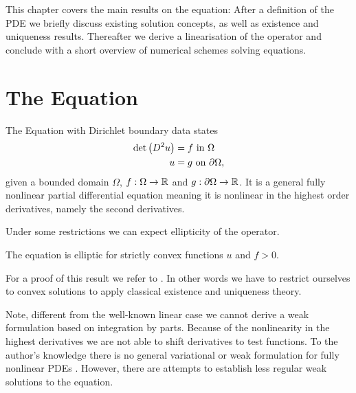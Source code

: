 This chapter covers the main results on the \MA equation: After a definition of the PDE we briefly discuss existing solution concepts, as well as existence and uniqueness results. Thereafter we derive a linearisation of the \MA operator and conclude with a short overview of numerical schemes solving \MA equations. 


\section{The \MA Equation}

The \MA Equation with Dirichlet boundary data states
\begin{align}
	 \det{\left(D^2 u\right)} &= f \textnormal{ in } \Omega \label{eq: MA eq}\\
	 u & = g \textnormal{ on } \partial \Omega, \label{eq: MA equation dirilecht}
\end{align}
given a bounded domain $\Omega$, $f:\Omega \rightarrow \mathbb{R}$ and $g:\partial \Omega \rightarrow \mathbb{R}$.
It is a general fully nonlinear partial differential equation meaning it is nonlinear in the highest order derivatives, namely the second derivatives.

Under some restrictions we can expect ellipticity of the \MA operator.
\begin{proposition}
	The \MA equation is elliptic for strictly convex functions $u$ and $f > 0$.
\end{proposition}
For a proof of this result we refer to \cite{CC1995, GT1983}. In other words we have to restrict ourselves to convex solutions to apply classical existence and uniqueness theory.

Note, different from the well-known linear case we cannot derive a weak formulation based on integration by parts. Because of the nonlinearity in the highest derivatives we are not able to shift derivatives to test functions. To the author's knowledge there is no general variational or weak formulation for fully nonlinear PDEs \cite{FGN2013}.
However, there are attempts to establish less regular weak solutions to the \MA equation.

